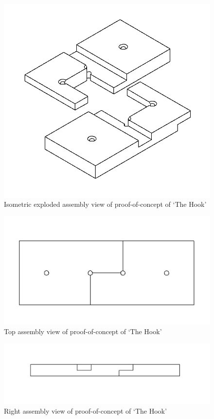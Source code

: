 \documentclass[12pt]{article}
\begin{document}
\begin{figure}[h!]
  \centering
  	\includegraphics[width=\textwidth]{Hook_iso}
  \caption{Isometric exploded assembly view of proof-of-concept of `The Hook'}
  \label{fig:hook_iso}
\end{figure}

\begin{figure}[h!]
  \centering
  	\includegraphics[width=\textwidth]{Hook_top}
  \caption{Top assembly view of proof-of-concept of `The Hook'}
  \label{fig:hook_top}
\end{figure}

\begin{figure}[h!]
  \centering
  	\includegraphics[width=\textwidth]{Hook_right}
  \caption{Right assembly view of proof-of-concept of `The Hook'}
  \label{fig:hook_right}
\end{figure}
\end{document}
